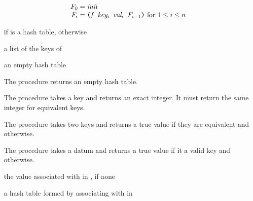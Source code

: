 $$\begin{array}{r@{\;=\;}l}
F_0 & \var{init}\\
F_i & \code{(\var{f} \var{key$_i$} \var{val$_i$} $F_{i-1}$)}
\hbox{ for $1 \le i \le n$}\\
\end{array}$$

\begin{procedure}
\end{procedure}
\returns{}  if  is a hash table, 
otherwise

\begin{procedure}
\end{procedure}
\returns{} a list of the keys of 

\begin{procedure}
\end{procedure}
\returns{} an empty hash table

The  procedure returns an empty hash table.

The  procedure takes a key and returns an exact
integer. It must return the same integer for equivalent keys.

The  procedure takes two keys and returns a true value
if they are equivalent and  otherwise.

The  procedure takes a datum and returns a true value
if it a valid key and  otherwise.

\begin{procedure}
\end{procedure}
\returns{} the value associated with  in ,
 if none

\begin{procedure}
\end{procedure}
\returns{} a hash table formed by associating  with 
in 

